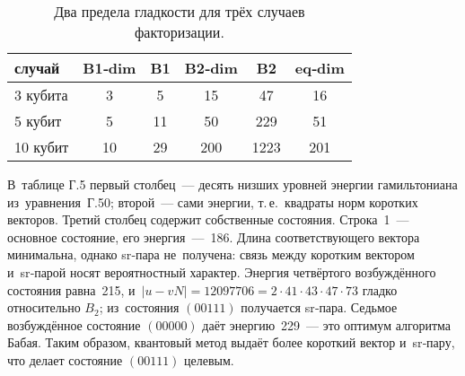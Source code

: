 \begin{table}[h]
    \centering
    \caption{
Два предела гладкости для трёх случаев факторизации.
    }
\begin{tabular}{@{}lccccc@{}}
\hline\hline
\textbf{случай} & \textbf{B1‑dim} & \textbf{B1} &
\textbf{B2‑dim} & \textbf{B2} & \textbf{eq‑dim} \\ \hline
3 кубита  & 3  &  5 &  15 &   47 &  16 \\
5 кубит   & 5  & 11 &  50 &  229 &  51 \\
10 кубит  & 10 & 29 & 200 & 1223 & 201 \\
\hline\hline
\end{tabular}
    \label{tab:tab6}
\end{table}

В таблице Г.5 первый столбец — десять низших уровней энергии гамильтониана
из уравнения Г.50; второй — сами энергии, т.\,е.\ квадраты норм коротких
векторов. Третий столбец содержит собственные состояния. Строка 1 — основное
состояние, его энергия — 186. Длина соответствующего вектора минимальна, однако
sr‑пара не~получена: связь между коротким вектором и sr‑парой носят
вероятностный характер. Энергия четвёртого возбуждённого состояния равна 215,
и~$|u-vN|=12097706= 2\!\cdot\!41\!\cdot\!43\!\cdot\!47\!\cdot\!73$ гладко
относительно $B_{2}$; из состояния $(00111)$ получается sr‑пара. Седьмое
возбуждённое состояние $(00000)$ даёт энергию 229 — это оптимум алгоритма
Бабая. Таким образом, квантовый метод выдаёт более короткий вектор и sr‑пару,
что делает состояние $(00111)$ целевым.

